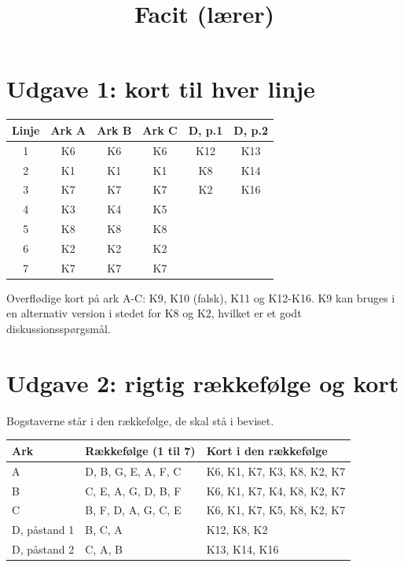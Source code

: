 \documentclass[a4paper,11pt]{article}
\date{}
\title{Facit (lærer)}
\begin{document}
\maketitle
\section*{Udgave 1: kort til hver linje}
\label{sec:orgb93ca6c}

\begin{center}
\begin{tabular}{|c|c|c|c|c|c|}
\hline
Linje & Ark A & Ark B & Ark C & D, p.1 & D, p.2\\
\hline
1 & K6 & K6 & K6 & K12 & K13\\
2 & K1 & K1 & K1 & K8 & K14\\
3 & K7 & K7 & K7 & K2 & K16\\
4 & K3 & K4 & K5 &  & \\
5 & K8 & K8 & K8 &  & \\
6 & K2 & K2 & K2 &  & \\
7 & K7 & K7 & K7 &  & \\
\hline
\end{tabular}
\end{center}

Overflødige kort på ark A-C: K9, K10 (falsk), K11 og K12-K16. K9 kan bruges i en alternativ version i stedet for K8 og K2, hvilket er et godt diskussionsspørgsmål.
\section*{Udgave 2: rigtig rækkefølge og kort}
\label{sec:org924371b}

Bogstaverne står i den rækkefølge, de skal stå i beviset.

\begin{center}
\begin{tabular}{|l|l|l|}
\hline
Ark & Rækkefølge (1 til 7) & Kort i den rækkefølge\\
\hline
A & D, B, G, E, A, F, C & K6, K1, K7, K3, K8, K2, K7\\
B & C, E, A, G, D, B, F & K6, K1, K7, K4, K8, K2, K7\\
C & B, F, D, A, G, C, E & K6, K1, K7, K5, K8, K2, K7\\
D, påstand 1 & B, C, A & K12, K8, K2\\
D, påstand 2 & C, A, B & K13, K14, K16\\
\hline
\end{tabular}
\end{center}
\end{document}
